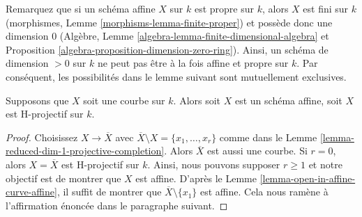 \noindent
Remarquez que si un schéma affine $X$ sur $k$ est
propre sur $k$, alors $X$ est fini sur $k$ (morphismes,
Lemme \ref{morphisms-lemma-finite-proper}) et possède
donc une dimension $0$ (Algèbre, Lemme
\ref{algebra-lemma-finite-dimensional-algebra} et
Proposition \ref{algebra-proposition-dimension-zero-ring}).
Ainsi, un schéma de dimension $> 0$ sur $k$ ne peut pas être
à la fois affine et propre sur $k$. Par conséquent, les
possibilités dans le lemme suivant sont mutuellement exclusives.

\begin{lemma}
\label{lemma-curve-affine-projective}
Supposons que $X$ soit une courbe sur $k$. Alors soit $X$
est un schéma affine, soit $X$ est H-projectif sur $k$.
\end{lemma}

\begin{proof}
Choisissez $X \to \overline{X}$ avec $\overline{X} \setminus
X = \{x_1, \ldots, x_r\}$ comme dans le Lemme
\ref{lemma-reduced-dim-1-projective-completion}. Alors
$\overline{X}$ est aussi une courbe. Si $r = 0$, alors $X =
\overline{X}$ est H-projectif sur $k$. Ainsi, nous pouvons
supposer $r \geq 1$ et notre objectif est de montrer que $X$ est
affine. D'après le Lemme \ref{lemma-open-in-affine-curve-affine}, il
suffit de montrer que $\overline{X} \setminus \{x_1\}$ est affine.
Cela nous ramène à l'affirmation énoncée dans le paragraphe suivant.


\end{proof}
